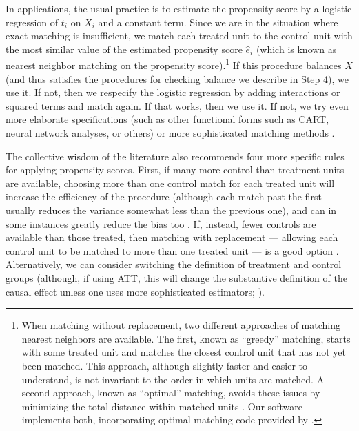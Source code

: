 \documentclass[11pt,titlepage]{article}
\begin{document}
In applications, the usual practice is to estimate the propensity
score by a logistic regression of $t_i$ on $X_i$ and a constant term.
Since we are in the situation where exact matching is insufficient, we
match each treated unit to the control unit with the most similar
value of the estimated propensity score $\hat{e}_i$ (which is known as
nearest neighbor matching on the propensity score).\footnote{When
  matching without replacement, two different approaches of matching
  nearest neighbors are available. The first, known as ``greedy''
  matching, starts with some treated unit and matches the closest
  control unit that has not yet been matched.  This approach, although
  slightly faster and easier to understand, is not invariant to the
  order in which units are matched.  A second approach, known as
  ``optimal'' matching, avoids these issues by minimizing the total
  distance within matched units \citep[e.g.,][]{Rosenbaum89}.  Our
  software implements both, incorporating optimal matching code
  provided by \citet{Hansen04}.}  If this procedure balances $X$ (and
thus satisfies the procedures for checking balance we describe in Step
4), we use it.  If not, then we respecify the logistic regression by
adding interactions or squared terms and match again.  If that works,
then we use it.  If not, we try even more elaborate specifications
(such as other functional forms such as CART, neural network analyses,
or others) or more sophisticated matching methods
\citep{Frolich04,SmiTod05}.

The collective wisdom of the literature also recommends four more
specific rules for applying propensity scores.  First, if many more
control than treatment units are available, choosing more than one
control match for each treated unit will increase the efficiency of
the procedure (although each match past the first usually reduces the
variance somewhat less than the previous one), and can in some
instances greatly reduce the bias too \citep{Smith97}.  If, instead,
fewer controls are available than those treated, then matching with
replacement --- allowing each control unit to be matched to more than
one treated unit --- is a good option \citep{DehWah99}.
Alternatively, we can consider switching the definition of treatment
and control groups (although, if using ATT, this will change the
substantive definition of the causal effect unless one uses more
sophisticated estimators; \citealt{Lechner00}).
\end{document}
